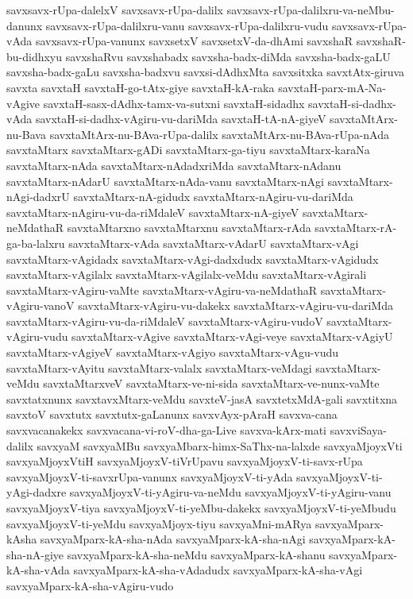 {savxsavx-rUpa-dalelxV
savxsavx-rUpa-dalilx
savxsavx-rUpa-dalilxru-va-neMbu-danunx
savxsavx-rUpa-dalilxru-vanu
savxsavx-rUpa-dalilxru-vudu
savxsavx-rUpa-vAda
savxsavx-rUpa-vanunx
savxsetxV
savxsetxV-da-dhAmi
savxshaR
savxshaR-bu-didhxyu
savxshaRvu
savxshabadx
savxsha-badx-diMda
savxsha-badx-gaLU
savxsha-badx-gaLu
savxsha-badxvu
savxsi-dAdhxMta
savxsitxka
savxtAtx-giruva
savxta
savxtaH
savxtaH-go-tAtx-giye
savxtaH-kA-raka
savxtaH-parx-mA-Na-vAgive
savxtaH-sasx-dAdhx-tamx-va-sutxni
savxtaH-sidadhx
savxtaH-si-dadhx-vAda
savxtaH-si-dadhx-vAgiru-vu-dariMda
savxtaH-tA-nA-giyeV
savxtaMtArx-nu-Bava
savxtaMtArx-nu-BAva-rUpa-dalilx
savxtaMtArx-nu-BAva-rUpa-nAda
savxtaMtarx
savxtaMtarx-gADi
savxtaMtarx-ga-tiyu
savxtaMtarx-karaNa
savxtaMtarx-nAda
savxtaMtarx-nAdadxriMda
savxtaMtarx-nAdanu
savxtaMtarx-nAdarU
savxtaMtarx-nAda-vanu
savxtaMtarx-nAgi
savxtaMtarx-nAgi-dadxrU
savxtaMtarx-nA-gidudx
savxtaMtarx-nAgiru-vu-dariMda
savxtaMtarx-nAgiru-vu-da-riMdaleV
savxtaMtarx-nA-giyeV
savxtaMtarx-neMdathaR
savxtaMtarxno
savxtaMtarxnu
savxtaMtarx-rAda
savxtaMtarx-rA-ga-ba-lalxru
savxtaMtarx-vAda
savxtaMtarx-vAdarU
savxtaMtarx-vAgi
savxtaMtarx-vAgidadx
savxtaMtarx-vAgi-dadxdudx
savxtaMtarx-vAgidudx
savxtaMtarx-vAgilalx
savxtaMtarx-vAgilalx-veMdu
savxtaMtarx-vAgirali
savxtaMtarx-vAgiru-vaMte
savxtaMtarx-vAgiru-va-neMdathaR
savxtaMtarx-vAgiru-vanoV
savxtaMtarx-vAgiru-vu-dakekx
savxtaMtarx-vAgiru-vu-dariMda
savxtaMtarx-vAgiru-vu-da-riMdaleV
savxtaMtarx-vAgiru-vudoV
savxtaMtarx-vAgiru-vudu
savxtaMtarx-vAgive
savxtaMtarx-vAgi-veye
savxtaMtarx-vAgiyU
savxtaMtarx-vAgiyeV
savxtaMtarx-vAgiyo
savxtaMtarx-vAgu-vudu
savxtaMtarx-vAyitu
savxtaMtarx-valalx
savxtaMtarx-veMdagi
savxtaMtarx-veMdu
savxtaMtarxveV
savxtaMtarx-ve-ni-sida
savxtaMtarx-ve-nunx-vaMte
savxtatxnunx
savxtavxMtarx-veMdu
savxteV-jasA
savxtetxMdA-gali
savxtitxna
savxtoV
savxtutx
savxtutx-gaLanunx
savxvAyx-pAraH
savxva-cana
savxvacanakekx
savxvacana-vi-roV-dha-ga-Live
savxva-kArx-mati
savxviSaya-dalilx
savxyaM
savxyaMBu
savxyaMbarx-himx-SaThx-na-lalxde
savxyaMjoyxVti
savxyaMjoyxVtiH
savxyaMjoyxV-tiVrUpavu
savxyaMjoyxV-ti-savx-rUpa
savxyaMjoyxV-ti-savxrUpa-vanunx
savxyaMjoyxV-ti-yAda
savxyaMjoyxV-ti-yAgi-dadxre
savxyaMjoyxV-ti-yAgiru-va-neMdu
savxyaMjoyxV-ti-yAgiru-vanu
savxyaMjoyxV-tiya
savxyaMjoyxV-ti-yeMbu-dakekx
savxyaMjoyxV-ti-yeMbudu
savxyaMjoyxV-ti-yeMdu
savxyaMjoyx-tiyu
savxyaMni-mARya
savxyaMparx-kAsha
savxyaMparx-kA-sha-nAda
savxyaMparx-kA-sha-nAgi
savxyaMparx-kA-sha-nA-giye
savxyaMparx-kA-sha-neMdu
savxyaMparx-kA-shanu
savxyaMparx-kA-sha-vAda
savxyaMparx-kA-sha-vAdadudx
savxyaMparx-kA-sha-vAgi
savxyaMparx-kA-sha-vAgiru-vudo
}
